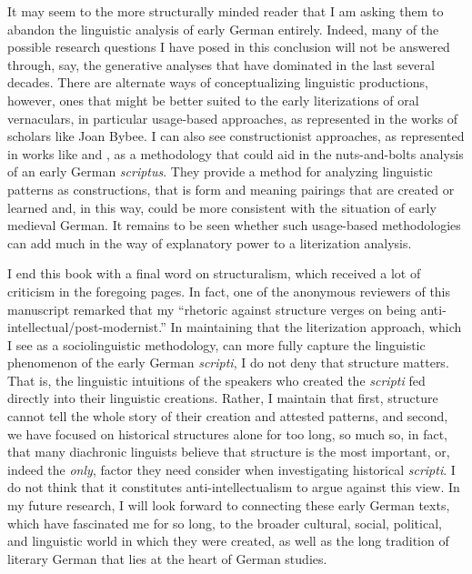   It may seem to the more structurally minded reader that I am asking them to abandon the linguistic analysis of early German entirely. Indeed, many of the possible research questions I have posed in this conclusion will not be answered through, say, the generative analyses that have dominated in the last several decades. There are alternate ways of conceptualizing linguistic productions, however, ones that might be better suited to the early literizations of oral vernaculars, in particular usage-based approaches, as represented in the works of scholars like Joan Bybee. I can also see constructionist approaches, as represented in works like \citet{Goldberg1995} and \citet{Goldberg2006}, as a methodology that could aid in the nuts-and-bolts analysis of an early German \textit{scriptus}. They provide a method for analyzing linguistic patterns as constructions, that is form and meaning pairings that are created or learned and, in this way, could be more consistent with the situation of early medieval German. It remains to be seen whether such usage-based methodologies can add much in the way of explanatory power to a literization analysis.

I end this book with a final word on structuralism, which received a lot of criticism in the foregoing pages. In fact, one of the anonymous reviewers of this manuscript remarked that my “rhetoric against structure verges on being anti-intellectual/post-modernist.” In maintaining that the literization approach, which I see as a sociolinguistic methodology, can more fully capture the linguistic phenomenon of the early German \textit{scripti}, I do not deny that structure matters. That is, the linguistic intuitions of the speakers who created the \textit{scripti} fed directly into their linguistic creations. Rather, I maintain that first, structure cannot tell the whole story of their creation and attested patterns, and second, we have focused on historical structures alone for too long, so much so, in fact, that many diachronic linguists believe that structure is the most important, or, indeed the\textit{ only}, factor they need consider when investigating historical \textit{scripti}. I do not think that it constitutes anti-intellectualism to argue against this view. In my future research, I will look forward to connecting these early German texts, which have fascinated me for so long, to the broader cultural, social, political, and linguistic world in which they were created, as well as the long tradition of literary German that lies at the heart of German studies.
